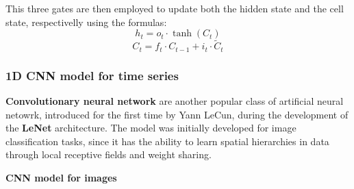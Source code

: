 This three gates are then employed to update both the hidden state and the cell state, respectivelly using the formulas:
\[
h_t = o_t \cdot \tanh(C_t)
\]
\[
C_t = f_t \cdot C_{t-1} + i_t \cdot \tilde{C}_t
\]

\subsubsection{1D CNN model for time series}
\textbf{Convolutionary neural network} are another popular class of artificial neural netowrk, introduced for the first time by Yann LeCun, during the development of the \textbf{LeNet} architecture\cite{lecun1989generalization}. The model was initially developed for image classification tasks, since it has the ability to learn spatial hierarchies in data through local receptive fields and weight sharing. 

\textbf{CNN model for images}


